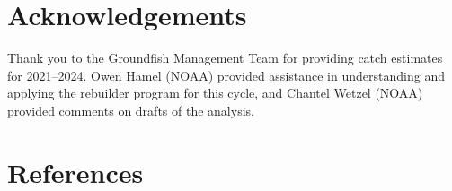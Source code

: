 \documentclass[11pt,
  letterpaper,
]{article}
\begin{document}
\hypertarget{acknowledgements}{%
\section{Acknowledgements}\label{acknowledgements}}

Thank you to the Groundfish Management Team for providing catch estimates for 2021--2024. Owen Hamel (NOAA) provided assistance in understanding and applying the rebuilder program for this cycle, and Chantel Wetzel (NOAA) provided comments on drafts of the analysis.

\clearpage

\hypertarget{references}{%
\section{References}\label{references}}
\end{document}
